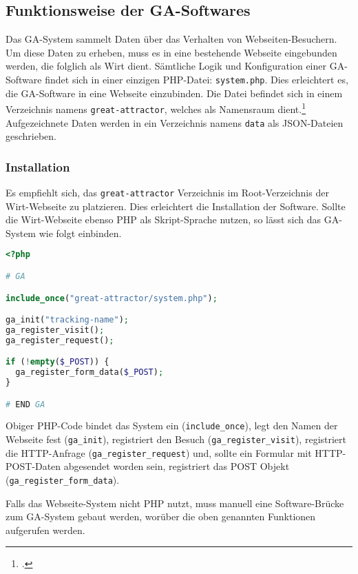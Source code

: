 \subsection{Funktionsweise der GA-Softwares}
\label{sub:funktionsweise_der_ga_softwares}

Das GA-System sammelt Daten über das Verhalten von Webseiten-Besuchern. Um
diese Daten zu erheben, muss es in eine bestehende Webseite eingebunden werden,
die folglich als Wirt dient. Sämtliche Logik und Konfiguration einer
GA-Software findet sich in einer einzigen PHP-Datei: \texttt{system.php}. Dies
erleichtert es, die GA-Software in eine Webseite einzubinden. Die Datei
befindet sich in einem Verzeichnis namens \texttt{great-attractor}, welches als
Namensraum dient.\footcite{wp:namensraum} Aufgezeichnete Daten werden in ein
Verzeichnis namens \texttt{data} als JSON-Dateien geschrieben.

\subsubsection{Installation}
\label{ssub:ga_installation}
Es empfiehlt sich, das \texttt{great-attractor} Verzeichnis im Root-Verzeichnis
der Wirt-Webseite zu platzieren. Dies erleichtert die Installation der
Software. Sollte die Wirt-Webseite ebenso PHP als Skript-Sprache nutzen, so
lässt sich das GA-System wie folgt einbinden.

\begin{lstlisting}[language=PHP]
<?php

# GA

include_once("great-attractor/system.php");

ga_init("tracking-name");
ga_register_visit();
ga_register_request();

if (!empty($_POST)) {
  ga_register_form_data($_POST);
}

# END GA
\end{lstlisting}

Obiger PHP-Code bindet das System ein (\texttt{include\_once}), legt den Namen
der Webseite fest (\texttt{ga\_init}), registriert den Besuch
(\texttt{ga\_register\_visit}), registriert die HTTP-Anfrage
(\texttt{ga\_register\_request}) und, sollte ein Formular mit HTTP-POST-Daten
abgesendet worden sein, registriert das POST Objekt
(\texttt{ga\_register\_form\_data}).

Falls das Webseite-System nicht PHP nutzt, muss manuell eine Software-Brücke
zum GA-System gebaut werden, worüber die oben genannten Funktionen aufgerufen
werden.

